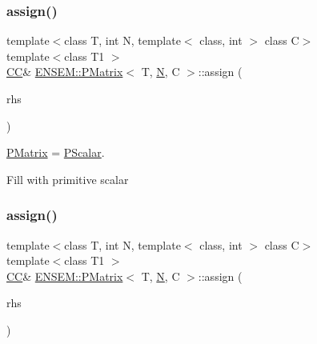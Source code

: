 \mbox{\label{classENSEM_1_1PMatrix_aa9ba4e8c3935c0591c0b63daef8edaa5}} 
\subsubsection{\texorpdfstring{assign()}{assign()}\hspace{0.1cm}{\footnotesize\ttfamily [3/6]}}
{\footnotesize\ttfamily template$<$class T, int N, template$<$ class, int $>$ class C$>$ \\
template$<$class T1 $>$ \\
\mbox{\hyperlink{classENSEM_1_1PMatrix_a744bac549029029effe32dc1705660ec}{CC}}\& \mbox{\hyperlink{classENSEM_1_1PMatrix}{E\+N\+S\+E\+M\+::\+P\+Matrix}}$<$ T, \mbox{\hyperlink{operator__name__util_8cc_a7722c8ecbb62d99aee7ce68b1752f337}{N}}, C $>$\+::assign (\begin{DoxyParamCaption}\item[{const \mbox{\hyperlink{classENSEM_1_1PScalar}{P\+Scalar}}$<$ T1 $>$ \&}]{rhs }\end{DoxyParamCaption})\hspace{0.3cm}{\ttfamily [inline]}}



\mbox{\hyperlink{classENSEM_1_1PMatrix}{P\+Matrix}} = \mbox{\hyperlink{classENSEM_1_1PScalar}{P\+Scalar}}. 

Fill with primitive scalar \mbox{\label{classENSEM_1_1PMatrix_aa9ba4e8c3935c0591c0b63daef8edaa5}} 
\subsubsection{\texorpdfstring{assign()}{assign()}\hspace{0.1cm}{\footnotesize\ttfamily [4/6]}}
{\footnotesize\ttfamily template$<$class T, int N, template$<$ class, int $>$ class C$>$ \\
template$<$class T1 $>$ \\
\mbox{\hyperlink{classENSEM_1_1PMatrix_a744bac549029029effe32dc1705660ec}{CC}}\& \mbox{\hyperlink{classENSEM_1_1PMatrix}{E\+N\+S\+E\+M\+::\+P\+Matrix}}$<$ T, \mbox{\hyperlink{operator__name__util_8cc_a7722c8ecbb62d99aee7ce68b1752f337}{N}}, C $>$\+::assign (\begin{DoxyParamCaption}\item[{const \mbox{\hyperlink{classENSEM_1_1PScalar}{P\+Scalar}}$<$ T1 $>$ \&}]{rhs }\end{DoxyParamCaption})\hspace{0.3cm}{\ttfamily [inline]}}



